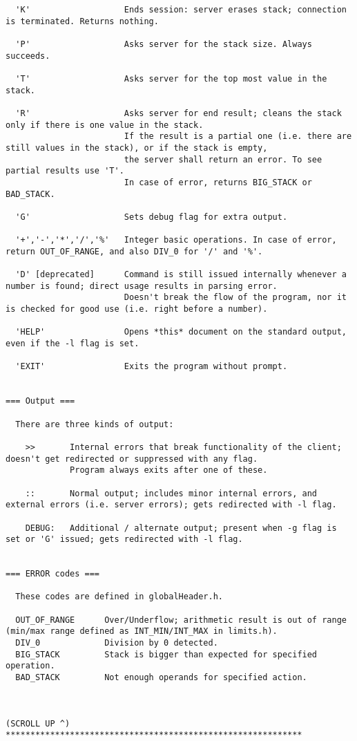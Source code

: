 \begin{lstlisting}
  'K'                   Ends session: server erases stack; connection is terminated. Returns nothing.

  'P'                   Asks server for the stack size. Always succeeds.

  'T'                   Asks server for the top most value in the stack.

  'R'                   Asks server for end result; cleans the stack only if there is one value in the stack.
                        If the result is a partial one (i.e. there are still values in the stack), or if the stack is empty,
                        the server shall return an error. To see partial results use 'T'.
                        In case of error, returns BIG_STACK or BAD_STACK.

  'G'                   Sets debug flag for extra output.

  '+','-','*','/','%'   Integer basic operations. In case of error, return OUT_OF_RANGE, and also DIV_0 for '/' and '%'.

  'D' [deprecated]      Command is still issued internally whenever a number is found; direct usage results in parsing error.
                        Doesn't break the flow of the program, nor it is checked for good use (i.e. right before a number).

  'HELP'                Opens *this* document on the standard output, even if the -l flag is set.

  'EXIT'                Exits the program without prompt.


=== Output ===

  There are three kinds of output:

    >>       Internal errors that break functionality of the client; doesn't get redirected or suppressed with any flag.
             Program always exits after one of these.

    ::       Normal output; includes minor internal errors, and external errors (i.e. server errors); gets redirected with -l flag.

    DEBUG:   Additional / alternate output; present when -g flag is set or 'G' issued; gets redirected with -l flag.


=== ERROR codes ===

  These codes are defined in globalHeader.h.

  OUT_OF_RANGE      Over/Underflow; arithmetic result is out of range (min/max range defined as INT_MIN/INT_MAX in limits.h).
  DIV_0             Division by 0 detected.
  BIG_STACK         Stack is bigger than expected for specified operation.
  BAD_STACK         Not enough operands for specified action.



(SCROLL UP ^)
************************************************************

\end{lstlisting}



